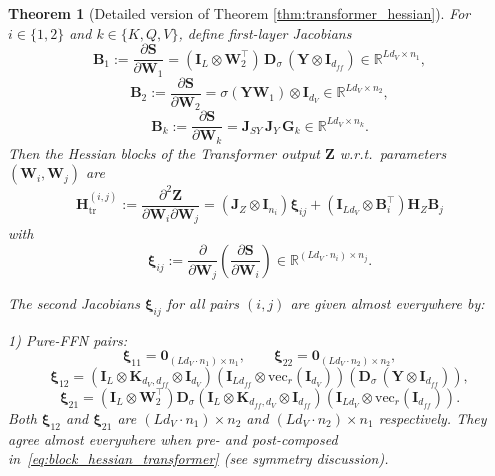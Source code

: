 \documentclass{article}
\newtheorem{theorem}{Theorem} %
\begin{document}
\begin{theorem}[Detailed version of Theorem \ref{thm:transformer_hessian}]
For $i \in \{1,2\}$ and $k \in \{K,Q,V\}$, define first-layer Jacobians
\[\mathbf{B}_1 := \frac{\partial \mathbf{S}}{\partial \mathbf{W}_1} = (\mathbf{I}_L \otimes \mathbf{W}_2^\top)\, \mathbf{D}_\sigma\, (\mathbf{Y} \otimes \mathbf{I}_{d_{ff}}) \in \mathbb{R}^{L d_V \times n_1}, \]
\[\mathbf{B}_2 := \frac{\partial \mathbf{S}}{\partial \mathbf{W}_2} = \sigma(\mathbf{Y}\mathbf{W}_1) \otimes \mathbf{I}_{d_V} \in \mathbb{R}^{L d_V \times n_2},\]
\[\mathbf{B}_k := \frac{\partial \mathbf{S}}{\partial \mathbf{W}_k} = \mathbf{J}_{SY}\, \mathbf{J}_Y\, \mathbf{G}_k \in \mathbb{R}^{L d_V \times n_k}.\]
Then the Hessian blocks of the Transformer output $\mathbf{Z}$ w.r.t.\ parameters $(\mathbf{W}_i,\mathbf{W}_j)$ are
\begin{equation} 
\boxed{
\;\mathbf{H}_{\mathrm{tr}}^{(i,j)} := \frac{\partial^2 \mathbf{Z}}{\partial \mathbf{W}_i \partial \mathbf{W}_j}
= \left( \mathbf{J}_Z \otimes \mathbf{I}_{n_i} \right) \boldsymbol{\xi}_{ij}
  + \left( \mathbf{I}_{L d_V} \otimes \mathbf{B}_i^\top \right) \mathbf{H}_Z \mathbf{B}_j \; } 
\end{equation}
with
\[\boldsymbol{\xi}_{ij} := \frac{\partial}{\partial \mathbf{W}_j} \left( \frac{\partial \mathbf{S}}{\partial \mathbf{W}_i} \right) \in \mathbb{R}^{(L d_V \cdot n_i) \times n_j}.\]

The second Jacobians $\boldsymbol{\xi}_{ij}$ for all pairs $(i,j)$ are given almost everywhere by:

1) Pure-FFN pairs:
\[
\boldsymbol{\xi}_{11} = \mathbf{0}_{(L d_V \cdot n_1) \times n_1}, 
\qquad 
\boldsymbol{\xi}_{22} = \mathbf{0}_{(L d_V \cdot n_2) \times n_2},
\]
\[\boldsymbol{\xi}_{12} = \left( \mathbf{I}_L \otimes \mathbf{K}_{d_V, d_{ff}} \otimes \mathbf{I}_{d_V} \right) \left( \mathbf{I}_{L d_{ff}} \otimes \mathrm{vec}_r(\mathbf{I}_{d_V}) \right)\left( \mathbf{D}_\sigma \, (\mathbf{Y} \otimes \mathbf{I}_{d_{ff}}) \right),\]
\[\boldsymbol{\xi}_{21} = \left( \mathbf{I}_L \otimes \mathbf{W}_2^\top \right) \mathbf{D}_\sigma \left( \mathbf{I}_L \otimes \mathbf{K}_{d_{ff}, d_V} \otimes \mathbf{I}_{d_{ff}} \right) \left( \mathbf{I}_{L d_V} \otimes \mathrm{vec}_r(\mathbf{I}_{d_{ff}}) \right).\]
Both $\boldsymbol{\xi}_{12}$ and $\boldsymbol{\xi}_{21}$ are $(L d_V \cdot n_1) \times n_2$ and $(L d_V \cdot n_2) \times n_1$ respectively. They agree almost everywhere when pre- and post-composed in~\eqref{eq:block_hessian_transformer} (see symmetry discussion).


\end{theorem}
\end{document}
